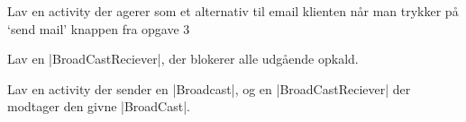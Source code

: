 \begin{exercise}
	Lav en activity der agerer som et alternativ til email klienten når man trykker på ‘send mail’ knappen fra opgave 3
\end{exercise}

\begin{exercise}
	Lav en \JavaInline|BroadCastReciever|, der blokerer alle udgående opkald.
\end{exercise}

\begin{exercise}
	Lav en activity der sender en \JavaInline|Broadcast|, og en \JavaInline|BroadCastReciever| der modtager den givne \JavaInline|BroadCast|.
\end{exercise}

